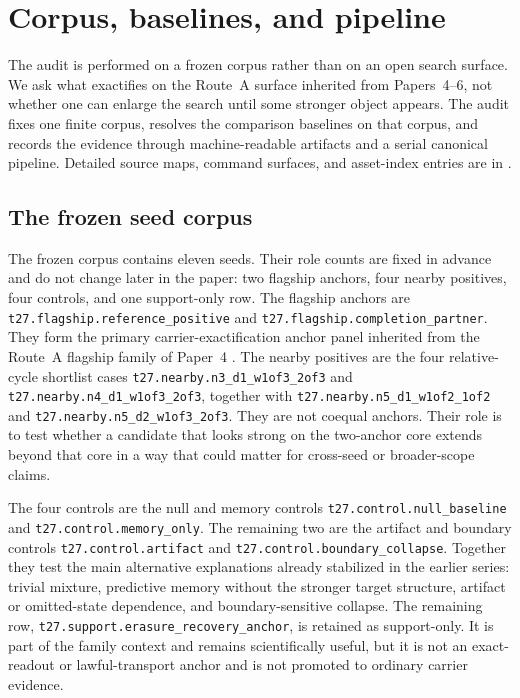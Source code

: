 \documentclass[11pt]{article}
\theoremstyle{definition}
\begin{document}
 \section{Corpus, baselines, and pipeline}
\label{sec:corpus-artifacts-pipeline}

The audit is performed on a frozen corpus rather than on an open search surface. We ask
what exactifies on the Route~A surface inherited from Papers~4--6, not whether one can
enlarge the search until some stronger object appears. The audit fixes one finite
corpus, resolves the comparison baselines on that corpus, and records the evidence
through machine-readable artifacts and a serial canonical pipeline. Detailed source
maps, command surfaces, and asset-index entries are in
.

\subsection{The frozen seed corpus}

The frozen corpus contains eleven seeds. Their role counts are fixed in advance and do
not change later in the paper: two flagship anchors, four nearby positives, four
controls, and one support-only row. The flagship anchors are
\texttt{t27.flagship.reference\_positive} and
\texttt{t27.flagship.completion\_partner}. They form the primary carrier-exactification
anchor panel inherited from the Route~A flagship family of Paper~4
\citep{Tsiokos2026RecombinationWitnesses}. The nearby positives are the four
relative-cycle shortlist cases \texttt{t27.nearby.n3\_d1\_w1of3\_2of3} and
\texttt{t27.nearby.n4\_d1\_w1of3\_2of3}, together with
\texttt{t27.nearby.n5\_d1\_w1of2\_1of2} and
\texttt{t27.nearby.n5\_d2\_w1of3\_2of3}. They are not coequal anchors. Their role is to
test whether a candidate that looks strong on the two-anchor core extends beyond that
core in a way that could matter for cross-seed or broader-scope claims.

The four controls are the null and memory controls
\texttt{t27.control.null\_baseline} and \texttt{t27.control.memory\_only}. The
remaining two are the artifact and boundary controls
\texttt{t27.control.artifact} and \texttt{t27.control.boundary\_collapse}.
Together they test the main alternative explanations already stabilized in the earlier
series: trivial mixture, predictive memory without the stronger target structure,
artifact or omitted-state dependence, and boundary-sensitive collapse. The remaining row,
\texttt{t27.support.erasure\_recovery\_anchor}, is retained as support-only. It is part
of the family context and remains scientifically useful, but it is not an exact-readout
or lawful-transport anchor and is not promoted to ordinary carrier evidence.
\end{document}
